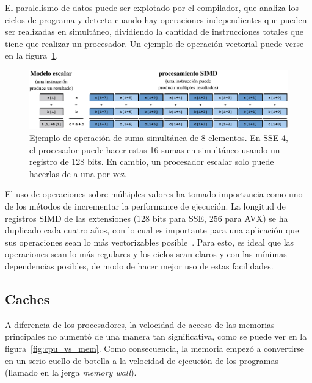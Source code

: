 El paralelismo de datos puede ser explotado por el compilador, que analiza los ciclos de programa y detecta cuando hay operaciones independientes que pueden ser realizadas en simult\'aneo, dividiendo la cantidad de instrucciones totales que tiene que realizar un procesador. Un ejemplo de operaci\'on vectorial puede verse en la figura~\ref{fig:simd-example}.

\begin{figure}[htbp]
    \centering
    \includegraphics[width=\plotwidth]{images/simd_ES.pdf}
    \caption{Ejemplo de operaci\'on de suma simult\'anea de 8 elementos. En SSE 4, el procesador puede hacer estas 16
    sumas en simult\'aneo usando un registro de 128 bits. En cambio, un procesador escalar solo puede hacerlas de a una por vez.}
    \label{fig:simd-example}
\end{figure}

El uso de operaciones sobre m\'ultiples valores ha tomado importancia como uno de los m\'etodos de incrementar la performance de ejecuci\'on.
La longitud de registros SIMD de las extensiones ($128$ bits para SSE, $256$ para AVX) se ha duplicado cada cuatro a\~nos, con lo cual es importante para una aplicaci\'on que sus operaciones sean lo m\'as vectorizables posible~\cite{HennessyPatterson}.
Para esto, es ideal que las operaciones sean lo m\'as regulares y los ciclos sean claros y con las m\'inimas dependencias posibles, de modo de hacer mejor uso de estas facilidades.

\subsection{Caches}

A diferencia de los procesadores, la velocidad de acceso de las memorias principales no aument\'o de una manera tan significativa, como se puede ver en la figura~\ref{fig:cpu_vs_mem}. Como consecuencia, la memoria empez\'o a convertirse en un serio cuello de botella a la velocidad de ejecuci\'on de los programas (llamado en la jerga \textit{memory wall}).

